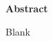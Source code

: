 \thispagestyle{empty}
\begin{center}
    \vspace*{2.5cm}
    \large
    \textbf{Abstract}
\end{center}
Blank
\clearpage